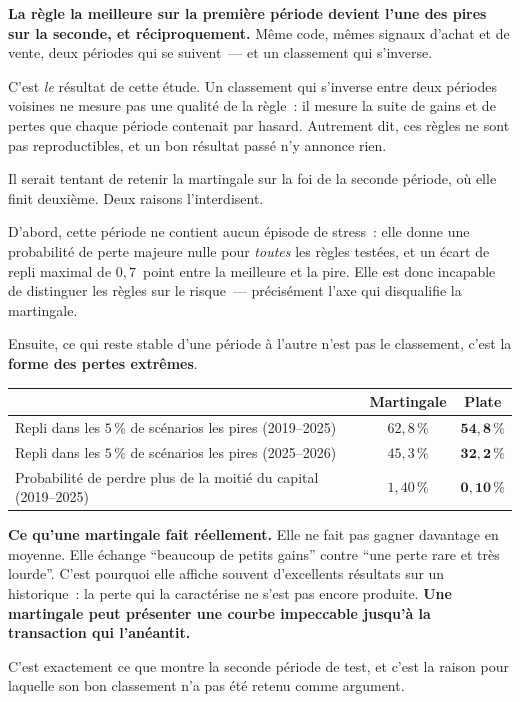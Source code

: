 \documentclass[11pt, a4paper]{scrartcl}
\begin{document}
\begin{thesisbox}
\textbf{La règle la meilleure sur la première période devient l'une des pires sur
la seconde, et réciproquement.} Même code, mêmes signaux d'achat et de vente,
deux périodes qui se suivent~--- et un classement qui s'inverse.

\smallskip
C'est \emph{le} résultat de cette étude. Un classement qui s'inverse entre deux
périodes voisines ne mesure pas une qualité de la règle~: il mesure la suite de
gains et de pertes que chaque période contenait par hasard. Autrement dit, ces
règles ne sont pas reproductibles, et un bon résultat passé n'y annonce rien.
\end{thesisbox}

Il serait tentant de retenir la martingale sur la foi de la seconde période, où
elle finit deuxième. Deux raisons l'interdisent.

D'abord, cette période ne contient aucun épisode de stress~: elle donne une
probabilité de perte majeure nulle pour \emph{toutes} les règles testées, et un
écart de repli maximal de $0{,}7$~point entre la meilleure et la pire. Elle est
donc incapable de distinguer les règles sur le risque~--- précisément l'axe qui
disqualifie la martingale.

Ensuite, ce qui reste stable d'une période à l'autre n'est pas le classement,
c'est la \textbf{forme des pertes extrêmes}.

\begin{center}
\renewcommand{\arraystretch}{1.3}
\small
\begin{tabular}{lcc}
\toprule
 & \textbf{Martingale} & \textbf{Plate} \\
\midrule
Repli dans les $5\,\%$ de scénarios les pires (2019--2025) & $62{,}8\,\%$ & $\mathbf{54{,}8\,\%}$ \\
Repli dans les $5\,\%$ de scénarios les pires (2025--2026) & $45{,}3\,\%$ & $\mathbf{32{,}2\,\%}$ \\
Probabilité de perdre plus de la moitié du capital (2019--2025) & $1{,}40\,\%$ & $\mathbf{0{,}10\,\%}$ \\
\bottomrule
\end{tabular}
\end{center}

\begin{warningbox}
\textbf{Ce qu'une martingale fait réellement.} Elle ne fait pas gagner davantage
en moyenne. Elle échange \enquote{beaucoup de petits gains} contre \enquote{une
perte rare et très lourde}. C'est pourquoi elle affiche souvent d'excellents
résultats sur un historique~: la perte qui la caractérise ne s'est pas encore
produite. \textbf{Une martingale peut présenter une courbe impeccable jusqu'à la
transaction qui l'anéantit.}

\smallskip
C'est exactement ce que montre la seconde période de test, et c'est la raison
pour laquelle son bon classement n'a pas été retenu comme argument.
\end{warningbox}
\end{document}
